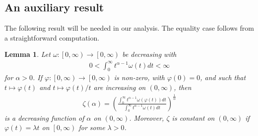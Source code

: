 \documentclass[preprint,12pt]{elsarticle}
\newtheorem{lem}{Lemma}
\begin{document}
\subsection{An auxiliary result}
The following result will be needed in our analysis. The equality case follows from a straightforward computation. 
\begin{lem}\cite[Lemma 2.6]{VD89}
Let $\omega:\left [ 0,\infty  \right )\to \left [ 0,\infty  \right ) $ be decreasing with
\begin{eqnarray}
0<\int_{0}^{\infty }t^{\alpha -1 }\omega \left ( t \right ) dt < \infty 
\end{eqnarray}
for $\alpha >0$. If $\varphi:\left [ 0,\infty  \right )\to \left [ 0,\infty  \right )$ is non-zero, with $\varphi \left ( 0 \right )  =0$, and such that $t\longmapsto \varphi \left ( t \right )$ and $t\longmapsto \varphi \left ( t \right )/t $ are increasing on $(0,\infty)$, then
\begin{eqnarray}
\zeta \left ( \alpha  \right )=\left ( \frac{\int_{0}^{\infty }t^{\alpha-1 }\omega \left ( \varphi \left ( t \right )  \right )dt   }{\int_{0}^{\infty }t^{\alpha-1 }\omega\left (t  \right )    dt   }  \right )^{\frac{1}{\alpha } }
\end{eqnarray}
is a decreasing function of $\alpha$ on $(0,\infty)$. Moreover, $\zeta$ is constant on $(0,\infty)$ if $\varphi \left ( t \right ) =\lambda t$ on $\left [ 0,\infty \right )$ for some $\lambda>0$.  
\end{lem}
\end{document}
